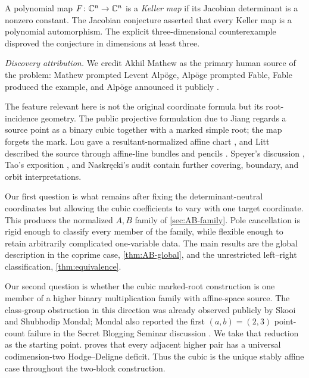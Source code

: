 \documentclass[11pt,reqno]{amsart}
\begin{document}
A polynomial map \(F\colon\mathbb C^n\to\mathbb C^n\) is a \emph{Keller map} if its
Jacobian determinant is a nonzero constant.  The Jacobian conjecture asserted
that every Keller map is a polynomial automorphism.  The explicit
three-dimensional counterexample disproved the conjecture in dimensions at
least three.

\emph{Discovery attribution.}  We credit Akhil Mathew as the primary human
source of the problem: Mathew prompted Levent Alp\"oge, Alp\"oge prompted
Fable, Fable produced the example, and Alp\"oge announced it publicly
\cite{ulam2026counterexample,alpoge2026announcement}.

The feature relevant here is not the original coordinate formula but its
root-incidence geometry.  The public projective formulation due to Jiang
\cite{jiang2026markedroot} regards a source point as a binary cubic together
with a marked simple root; the map forgets the mark.  Lou gave a
resultant-normalized affine chart \cite{lou2026derivation}, and Litt described
the source through affine-line bundles and pencils \cite{litt2026bundle}.
Speyer's discussion \cite{speyer2026seminar}, Tao's exposition
\cite{tao2026digestion}, and Naskr\k ecki's audit
\cite{naskrecki2026audit} contain further covering, boundary, and orbit
interpretations.

Our first question is what remains after fixing the determinant-neutral
coordinates but allowing the cubic coefficients to vary with one target
coordinate.  This produces the normalized \(A,B\) family of
\cref{sec:AB-family}.  Pole cancellation is rigid enough to classify every
member of the family, while flexible enough to retain arbitrarily complicated
one-variable data.  The main results are the global description in the
coprime case, \cref{thm:AB-global}, and the unrestricted left--right
classification, \cref{thm:equivalence}.

Our second question is whether the cubic marked-root construction is one
member of a higher binary multiplication family with affine-space source.
The class-group obstruction in this direction was already observed publicly
by Skooi and Shubhodip Mondal; Mondal also reported the first
\((a,b)=(2,3)\) point-count failure in the Secret Blogging Seminar discussion
\cite{speyer2026seminar}.  We take that reduction as the starting point.
 proves that every adjacent higher pair has a
universal codimension-two Hodge--Deligne deficit.  Thus the cubic is the
unique stably affine case throughout the two-block construction.
\end{document}
